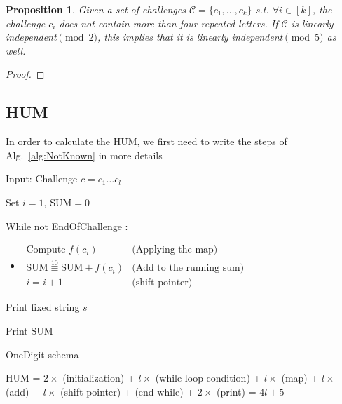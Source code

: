 \documentclass{article}
\newtheorem{proposition}[theorem]{Proposition}
\newenvironment{alg}{
    \begin{list}{}{
        \setlength{\itemsep}{2pt}
        \setlength{\parsep}{0pt}
        \setlength{\parskip}{0pt}
        \setlength{\topsep}{1pt}
    }
}
{
    \end{list}
}
\begin{document}
\begin{proposition}
\label{prop:mod2}
Given a set of challenges $\mathcal{C}=\{c_1,\ldots,c_k\}$ s.t. $\forall i\in[k]$, the challenge $c_i$ does not contain more than four repeated letters. If $\mathcal{C}$ is linearly independent$\pmod{2}$, this implies that it is linearly independent$\pmod{5}$ as well.
\end{proposition}
\begin{proof}
	
\end{proof}
	
	






\subsection{HUM}
In order to calculate the HUM, we first need to write the steps of Alg.~\ref{alg:NotKnown} in more details

\begin{algorithm}
\begin{alg}
\item[] Input: Challenge $c=c_1 \ldots c_l$
\item[] Set $i=1$, SUM$=0$
\item[] While not EndOfChallenge :

\begin{itemize}
	\item[] $\begin{array}{lr}
		\text{Compute } f(c_i) & \text{(Applying the map)} \\
		\text{SUM} \overset{10}{\equiv} \text{SUM} + f(c_i) & \text{(Add to the running sum)} \\
			i=i+1 & \text{(shift pointer)} 
	\end{array}$
\end{itemize}

\item[] Print fixed string $s$
\item[] Print SUM

\label{alg:HUM}
\end{alg}
\caption{OneDigit schema}
\end{algorithm}

HUM =  $2 \times$ (initialization) + $l \times$ (while loop condition) + $l \times$ (map) + $l \times$ (add) + $l \times$ (shift pointer) + (end while) + $2 \times$ (print) = $4l+5$
\end{document}
